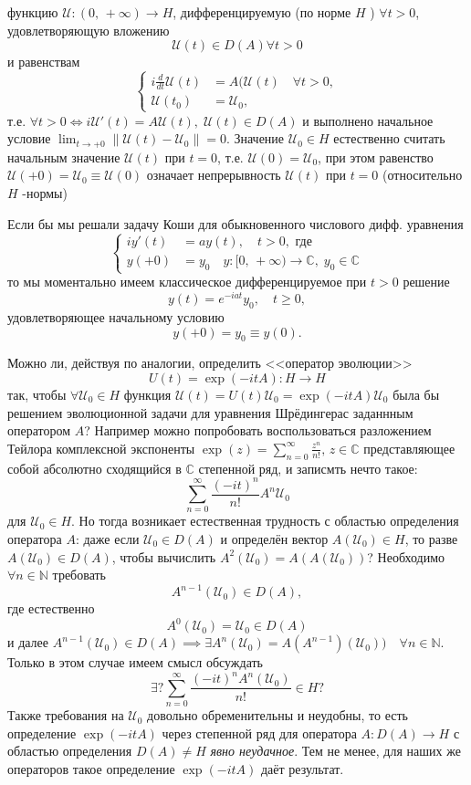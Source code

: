 \documentclass[a4paper]{article}
\begin{document}
функцию $\mathcal{U}: (0,\,+\infty)\to  H$, дифференцируемую (по норме $H$ )
$\forall t >0$, удовлетворяющую вложению
\[
	\mathcal{U}(t) \in  D(A) \forall t> 0
\]
и равенствам
 \[
\left\{
\begin{aligned}
	i \frac{d}{dt} \mathcal{U}(t) &= A (\mathcal{U}(t) \quad \forall t>0,\\
	\mathcal{U}(t_0)&=\mathcal{U}_0,
\end{aligned}
\right.
\] 
т.е. $\forall t>0 \Leftrightarrow i \mathcal{U}'(t)=A \mathcal{U}(t), \; \mathcal{U}(t) \in  D(A)$ 
и выполнено начальное условие $\lim_{t \to +0} \| 
\mathcal{U}(t) -\mathcal{U}_0\|=0 $. Значение $\mathcal{U}_0 \in H$ естественно считать
начальным значение $\mathcal{U}(t)$ при $t=0$, т.\:е. $\mathcal{U}(0)=\mathcal{U}_0$, при этом
равенство $\mathcal{U}(+0)=\mathcal{U}_0\equiv \mathcal{U}(0)$ означает непрерывность $\mathcal{U}(t)$ при
$t=0$ (относительно $H$ -нормы)
\begin{rem}
	Если бы мы решали задачу Коши для обыкновенного
	числового дифф. уравнения
	\[
	\left\{
	\begin{aligned}
		i y'(t) &= a y(t), \quad t>0, \text{ где}\\
		y(+0)&=y_0 \quad y:[0,\,+\infty) \to \mathbb{C},\; y_0 \in \mathbb{C}
	\end{aligned}
	\right.
	\]
	то мы моментально имеем классическое дифференцируемое
	при $t>0$ решение
	\[
		y(t)= e^{-i a t}y_0, \quad t\ge 0,
	\]
	удовлетворяющее начальному условию
	\[
		y(+0)=y_0\equiv y(0)
	.\] 
\end{rem}
Можно ли, действуя по аналогии, определить <<оператор эволюции>>
\[
	U(t) =\exp(-i t A) : H \to  H
\]
так, чтобы $\forall \mathcal{U}_0 \in H$  функция $\mathcal{U}(t) = U(t) \mathcal{U}_0=
\exp (-itA)\mathcal{U}_0$ была бы решением эволюционной задачи для уравнения
Шрёдингерас заданнным оператором $A$? Например можно попробовать
воспользоваться разложением Тейлора комплексной экспоненты
$\exp(z)=\sum_{n=0}^{\infty} \frac{z^n}{n!},\, z \in \mathbb{C}$
представляющее собой абсолютно сходящийся в $\mathbb{C}$ степенной
ряд, и  записмть нечто такое:
\[
	\sum_{n=0}^{\infty} \frac{(-it)^n}{n!}A^n \mathcal{U}_0
\]
для $\mathcal{U}_0 \in H$. Но тогда возникает естественная трудность
с областью определения оператора $A$:
даже если  $\mathcal{U}_0 \in D(A)$ и определён вектор $A(\mathcal{U}_0) \in H$,
то разве $A(\mathcal{U}_0) \in D(A)$, чтобы вычислить $A^2(\mathcal{U}_0)=
A(A(\mathcal{U}_0))$? Необходимо $\forall n \in  \mathbb{N}$ требовать
\[
	A^{n-1}(\mathcal{U}_0) \in D(A),
\] 
где естественно
\[
	A^0(\mathcal{U}_0)= \mathcal{U}_0 \in D(A)
\]
и далее $A^{n-1}(\mathcal{U}_0) \in D(A) \implies \exists A^n(\mathcal{U}_0)=
A(A^{n-1})(\mathcal{U}_0)) \quad \forall n \in \mathbb{N}$. Только в этом
случае имеем смысл обсуждать
\[
	\exists ? \sum_{n=0}^{\infty} \frac{(-it)^n A^n (\mathcal{U}_0)}{n!} \in H ?
\] 
Также требования на $\mathcal{U}_0$ довольно обременительны и неудобны, то
есть определение $\exp(-i t A)$ через степенной ряд для
оператора $A : D(A) \to H$ с областью определения $D(A) \neq H$ 
\emph{явно неудачное}. Тем не менее, для наших же операторов
такое определение $\exp (-it A)$ даёт результат.
\end{document}
